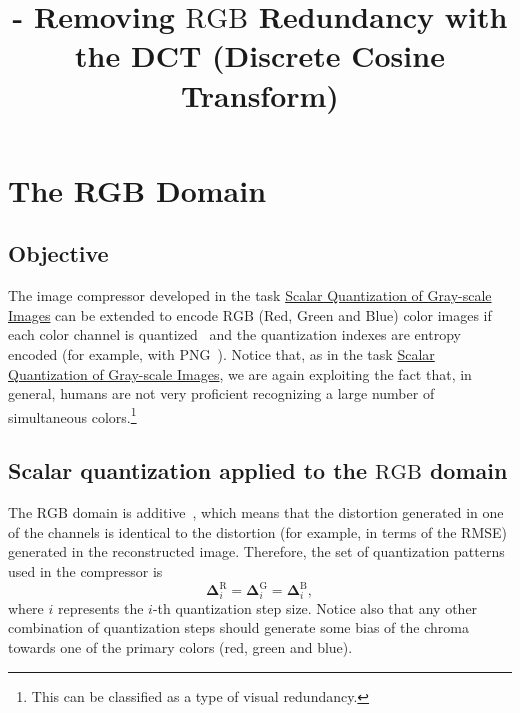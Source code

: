 

\title{\SM{} - Removing $\text{RGB}$ Redundancy with the DCT (Discrete Cosine Transform)}

\maketitle
\tableofcontents

\section{The RGB Domain}

\subsection{Objective}
The image compressor developed in the task
\href{https://sistemas-multimedia.github.io/contents/gray_SQ/}{Scalar
  Quantization of Gray-scale Images} can be extended to encode
$\text{RGB}$ (Red, Green and Blue) color images if each color channel
is quantized~\cite{vruiz__scalar_quantization} and the quantization
indexes are entropy encoded (for example, with
PNG~\cite{vruiz__PNG}). Notice that, as in the task
\href{https://sistemas-multimedia.github.io/contents/gray_SQ/}{Scalar
  Quantization of Gray-scale Images}, we are again exploiting the fact
that, in general, humans are not very proficient recognizing a large
number of simultaneous colors.\footnote{This can be classified as a
type of visual redundancy.}

\subsection{Scalar quantization applied to the $\text{RGB}$ domain}
The $\text{RGB}$ domain is additive~\cite{burger2016digital}, which
means that the distortion generated in one of the channels is
identical to the distortion (for example, in terms of the RMSE)
generated in the reconstructed image. Therefore, the set of
quantization patterns used in the compressor is
\begin{equation}
  \mathbf{\Delta}^{\text{R}}_i = \mathbf{\Delta}^{\text{G}}_i =
  \mathbf{\Delta}^{\text{B}}_i,
  \label{eq:simple_Q}
\end{equation}
where $i$ represents the $i$-th quantization step size.  Notice also
that any other combination of quantization steps should generate some
bias of the chroma towards one of the primary colors (red, green and
blue).

